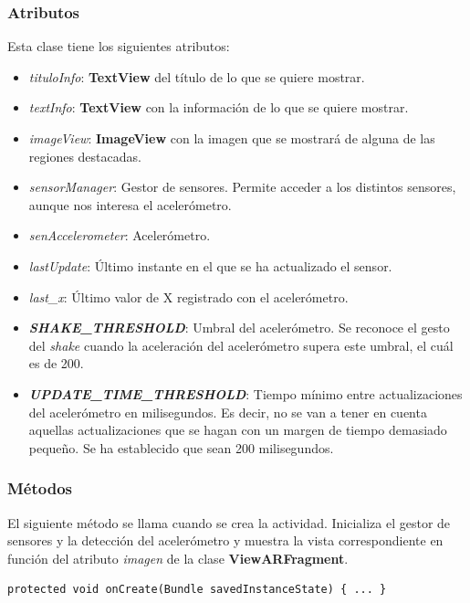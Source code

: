 \documentclass[11pt,a4paper]{article}
\begin{document}
\subsubsection{Atributos}

Esta clase tiene los siguientes atributos:

\begin{itemize}
    \item \textit{tituloInfo}: \textbf{TextView} del título de lo que se quiere mostrar.
    \item \textit{textInfo}: \textbf{TextView} con la información de lo que se quiere mostrar.
    \item \textit{imageView}: \textbf{ImageView} con la imagen que se mostrará de alguna de las regiones destacadas.
    \item \textit{sensorManager}: Gestor de sensores. Permite acceder a los distintos sensores, aunque nos interesa el acelerómetro.
    \item \textit{senAccelerometer}: Acelerómetro.
    \item \textit{lastUpdate}: Último instante en el que se ha actualizado el sensor.
    \item \textit{last\_x}: Último valor de X registrado con el acelerómetro.
    \item \textit{\textbf{SHAKE\_THRESHOLD}}: Umbral del acelerómetro. Se reconoce el gesto del \textit{shake} cuando la aceleración
    del acelerómetro supera este umbral, el cuál es de 200.
    \item \textit{\textbf{UPDATE\_TIME\_THRESHOLD}}: Tiempo mínimo entre actualizaciones del acelerómetro en milisegundos. Es decir,
    no se van a tener en cuenta aquellas actualizaciones que se hagan con un margen de tiempo demasiado pequeño. Se ha establecido
    que sean 200 milisegundos.
\end{itemize}

\subsubsection{Métodos}

El siguiente método se llama cuando se crea la actividad. Inicializa el gestor de sensores y la detección del acelerómetro y muestra
la vista correspondiente en función del atributo \textit{imagen} de la clase \textbf{ViewARFragment}.

\begin{lstlisting}
protected void onCreate(Bundle savedInstanceState) { ... }
\end{lstlisting}
\end{document}
